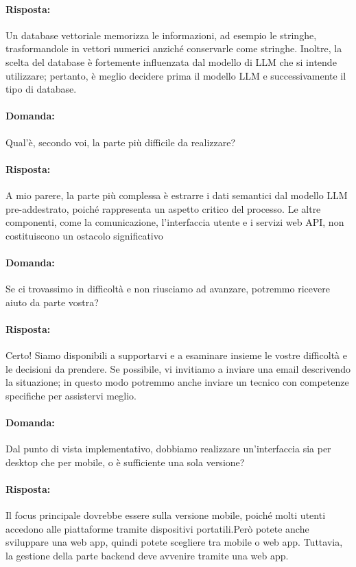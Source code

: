 \documentclass[a4paper, 12pt]{article}
\begin{document}
\paragraph{Risposta:} Un database vettoriale memorizza le informazioni, ad esempio le stringhe, trasformandole in vettori numerici anziché conservarle come stringhe. Inoltre, la scelta del database è fortemente influenzata dal modello di LLM che si intende utilizzare; pertanto, è meglio decidere prima il modello LLM e successivamente il tipo di database.

\vspace{1.2cm}

\paragraph{Domanda:}  Qual'è, secondo voi, la parte più difficile da realizzare?
\paragraph{Risposta:} A mio parere, la parte più complessa è estrarre i dati semantici dal modello LLM pre-addestrato, poiché rappresenta un aspetto critico del processo. Le altre componenti, come la comunicazione, l'interfaccia utente e i servizi web API, non costituiscono un ostacolo significativo

\vspace{1.2cm}

\paragraph{Domanda:} Se ci trovassimo in difficoltà e non riusciamo ad avanzare, potremmo ricevere aiuto da parte vostra?
\paragraph{Risposta:} Certo! Siamo disponibili a supportarvi e a esaminare insieme le vostre difficoltà e le decisioni da prendere. Se possibile, vi invitiamo a inviare una email descrivendo la situazione; in questo modo potremmo anche inviare un tecnico con competenze specifiche per assistervi meglio.
\vspace{1.2cm}

\paragraph{Domanda:} Dal punto di vista implementativo, dobbiamo realizzare un'interfaccia sia per desktop che per mobile, o è sufficiente una sola versione?

\paragraph{Risposta:} Il focus principale dovrebbe essere sulla versione mobile, poiché molti utenti accedono alle piattaforme tramite dispositivi portatili.Però potete anche sviluppare una web app, quindi potete scegliere tra mobile o web app. Tuttavia, la gestione della parte backend deve avvenire tramite una web app.
\vspace{1.2cm}
\end{document}
